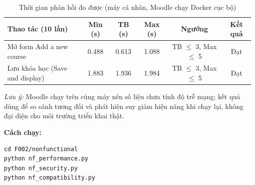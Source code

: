 \begin{table}[H]\centering\small
\begin{tabular}{|l|c|c|c|c|c|}\hline
\rowcolor{gray!15}\textbf{Thao tác (10 lần)} & \textbf{Min (s)} & \textbf{TB (s)} & \textbf{Max (s)} & \textbf{Ngưỡng} & \textbf{Kết quả} \\ \hline
Mở form Add a new course & 0.488 & 0.613 & 1.088 & TB $\leq$ 3, Max $\leq$ 5 & Đạt \\ \hline
Lưu khóa học (Save and display) & 1.883 & 1.936 & 1.984 & TB $\leq$ 3, Max $\leq$ 5 & Đạt \\ \hline
\end{tabular}\caption{Thời gian phản hồi đo được (máy cá nhân, Moodle chạy Docker cục bộ)}\end{table}
\textit{Lưu ý:} Moodle chạy trên cùng máy nên số liệu chưa tính độ trễ mạng; kết quả dùng để so sánh tương đối và phát hiện
suy giảm hiệu năng khi chạy lại, không đại diện cho môi trường triển khai thật.

\textbf{Cách chạy:}
\begin{lstlisting}
cd F002/nonfunctional
python nf_performance.py
python nf_security.py
python nf_compatibility.py
\end{lstlisting}
